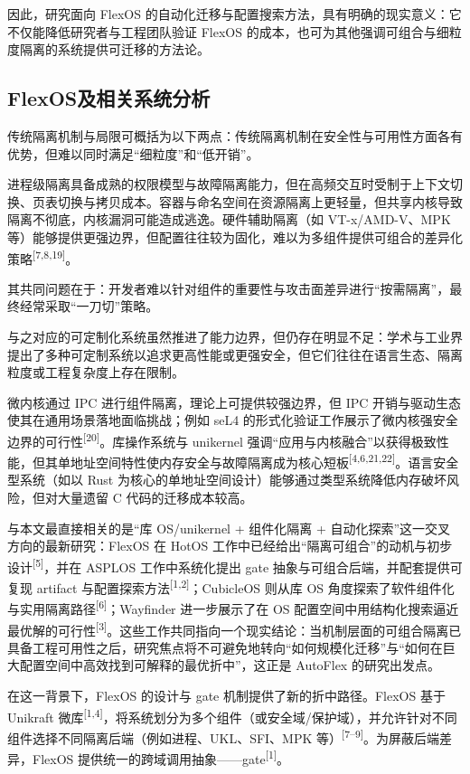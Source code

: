 \documentclass[UTF8,a4paper,12pt]{ctexart}
\numberwithin{equation}{section}
\begin{document}
因此，研究面向 FlexOS
的自动化迁移与配置搜索方法，具有明确的现实意义：它不仅能降低研究者与工程团队验证
FlexOS
的成本，也可为其他强调可组合与细粒度隔离的系统提供可迁移的方法论。

\subsection{FlexOS及相关系统分析}

传统隔离机制与局限可概括为以下两点：传统隔离机制在安全性与可用性方面各有优势，但难以同时满足``细粒度''和``低开销''。

进程级隔离具备成熟的权限模型与故障隔离能力，但在高频交互时受制于上下文切换、页表切换与拷贝成本。容器与命名空间在资源隔离上更轻量，但共享内核导致隔离不彻底，内核漏洞可能造成逃逸。硬件辅助隔离（如
VT-x/AMD-V、MPK
等）能够提供更强边界，但配置往往较为固化，难以为多组件提供可组合的差异化策略\textsuperscript{[7,8,19]}。

其共同问题在于：开发者难以针对组件的重要性与攻击面差异进行``按需隔离''，最终经常采取``一刀切''策略。

与之对应的可定制化系统虽然推进了能力边界，但仍存在明显不足：学术与工业界提出了多种可定制系统以追求更高性能或更强安全，但它们往往在语言生态、隔离粒度或工程复杂度上存在限制。

微内核通过 IPC 进行组件隔离，理论上可提供较强边界，但 IPC
开销与驱动生态使其在通用场景落地面临挑战；例如 seL4
的形式化验证工作展示了微内核强安全边界的可行性\textsuperscript{[20]}。库操作系统与
unikernel
强调``应用与内核融合''以获得极致性能，但其单地址空间特性使内存安全与故障隔离成为核心短板\textsuperscript{[4,6,21,22]}。语言安全型系统（如以
Rust
为核心的单地址空间设计）能够通过类型系统降低内存破坏风险，但对大量遗留 C
代码的迁移成本较高。

与本文最直接相关的是``库 OS/unikernel + 组件化隔离 +
自动化探索''这一交叉方向的最新研究：FlexOS 在 HotOS
工作中已经给出``隔离可组合''的动机与初步设计\textsuperscript{[5]}，并在
ASPLOS 工作中系统化提出 gate
抽象与可组合后端，并配套提供可复现 artifact
与配置探索方法\textsuperscript{[1,2]}；CubicleOS 则从库 OS
角度探索了软件组件化与实用隔离路径\textsuperscript{[6]}；Wayfinder 进一步展示了在 OS
配置空间中用结构化搜索逼近最优解的可行性\textsuperscript{[3]}。这些工作共同指向一个现实结论：当机制层面的可组合隔离已具备工程可用性之后，研究焦点将不可避免地转向``如何规模化迁移''与``如何在巨大配置空间中高效找到可解释的最优折中''，这正是
AutoFlex 的研究出发点。

在这一背景下，FlexOS 的设计与 gate 机制提供了新的折中路径。FlexOS 基于 Unikraft
微库\textsuperscript{[1,4]}，将系统划分为多个组件（或安全域/保护域），并允许针对不同组件选择不同隔离后端（例如进程、UKL、SFI、MPK
等）\textsuperscript{[7--9]}。为屏蔽后端差异，FlexOS
提供统一的跨域调用抽象------gate\textsuperscript{[1]}。
\end{document}
